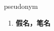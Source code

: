 
\begin{frame}
{\huge pseudonym}
\begin{center}
\begin{enumerate}\Large
  \item \textbf{假名，笔名}
\end{enumerate}
\end{center}
\end{frame}

